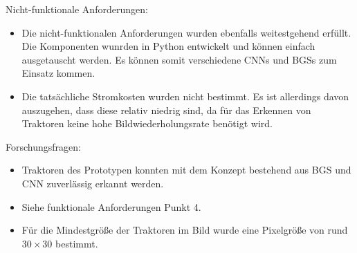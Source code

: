 Nicht-funktionale Anforderungen:
\begin{itemize}
    \item Die nicht-funktionalen Anforderungen wurden ebenfalls weitestgehend erfüllt.
    Die Komponenten wunrden in Python entwickelt und können einfach ausgetauscht werden.
    Es können somit verschiedene \acp{CNN} und \acp{BGS} zum Einsatz kommen.

    \item Die tatsächliche Stromkosten wurden nicht bestimmt.
    Es ist allerdings davon auszugehen, dass diese relativ niedrig sind, da für das Erkennen von Traktoren keine hohe Bildwiederholungsrate benötigt wird.
\end{itemize}

Forschungsfragen:
\begin{itemize}
    \item Traktoren des Prototypen konnten mit dem Konzept bestehend aus \ac{BGS} und \ac{CNN} zuverlässig erkannt werden.
    \item {}
    Siehe funktionale Anforderungen Punkt 4.
    \item Für die Mindestgröße der Traktoren im Bild wurde eine Pixelgröße von rund $30 \times 30$ bestimmt. 
\end{itemize}